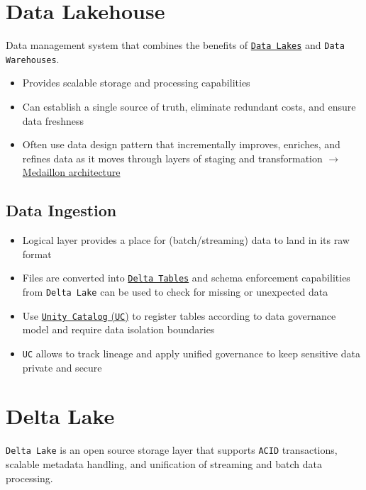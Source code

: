 \documentclass[11pt]{scrartcl}
\begin{document}
\tableofcontents

\newpage
\section{Data Lakehouse}
Data management system that combines the benefits of \hyperref[delta_lake]{\texttt{Data Lakes}} and \texttt{Data Warehouses}.
\begin{itemize}
	\item Provides scalable storage and processing capabilities 
	\item Can establish a single source of truth, eliminate redundant costs, and ensure data freshness
	\item Often use data design pattern that incrementally improves, enriches, and refines data as it moves through layers of staging and transformation $\to$ \hyperref[medaillon]{Medaillon architecture}
\end{itemize}

\subsection{Data Ingestion}
\begin{itemize}
	\item Logical layer provides a place for (batch/streaming) data to land in its raw format
	\item Files are converted into \hyperref[delta_lake_table]{\texttt{Delta Tables}} and schema enforcement capabilities from \texttt{Delta Lake} can be used to check for missing or unexpected data
	\item Use \hyperref[unity_catalog]{\texttt{Unity Catalog} (\texttt{UC})} to register tables according to data governance model and require data isolation boundaries
	\item \texttt{UC} allows to track lineage and apply unified governance to keep sensitive data private and secure
\end{itemize}


\section{Delta Lake} \label{delta_lake}
\texttt{Delta Lake} is an open source storage layer that supports \texttt{ACID} transactions, scalable metadata handling, and unification of streaming and batch data processing. 
\end{document}
